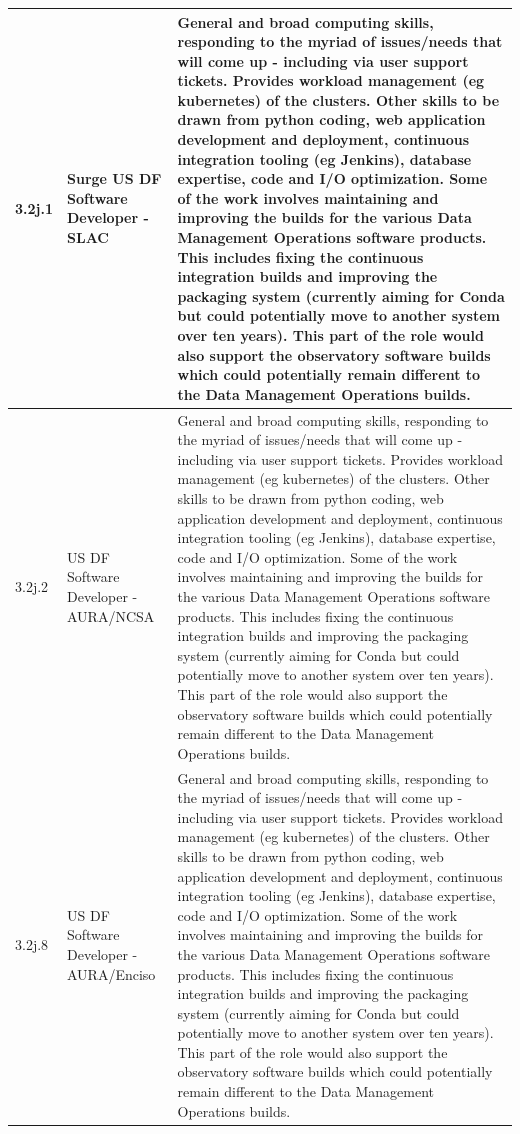\begin{longtable} {|p{}|p{}|p{}|}
{3.2j.1}&{Surge US DF Software Developer - SLAC}&{General and broad computing skills, responding to the myriad of issues/needs that will come up - including via user support tickets. Provides workload management (eg kubernetes) of the clusters. Other skills to be drawn from python coding, web application development and deployment, continuous integration tooling (eg Jenkins), database expertise, code and I/O optimization. Some of the work involves maintaining and improving the builds for the various Data Management Operations software products. This includes fixing the continuous integration builds and improving the packaging system (currently aiming for Conda but could potentially move to another system over ten years). This part of the role would also support the observatory software builds which could potentially remain different to the Data Management Operations builds.} \\ \hline
{3.2j.2}&{US DF Software Developer - AURA/NCSA}&{General and broad computing skills, responding to the myriad of issues/needs that will come up - including via user support tickets. Provides workload management (eg kubernetes) of the clusters. Other skills to be drawn from python coding, web application development and deployment, continuous integration tooling (eg Jenkins), database expertise, code and I/O optimization. Some of the work involves maintaining and improving the builds for the various Data Management Operations software products. This includes fixing the continuous integration builds and improving the packaging system (currently aiming for Conda but could potentially move to another system over ten years). This part of the role would also support the observatory software builds which could potentially remain different to the Data Management Operations builds.} \\ \hline
{3.2j.8}&{US DF Software Developer - AURA/Enciso}&{General and broad computing skills, responding to the myriad of issues/needs that will come up - including via user support tickets. Provides workload management (eg kubernetes) of the clusters. Other skills to be drawn from python coding, web application development and deployment, continuous integration tooling (eg Jenkins), database expertise, code and I/O optimization. Some of the work involves maintaining and improving the builds for the various Data Management Operations software products. This includes fixing the continuous integration builds and improving the packaging system (currently aiming for Conda but could potentially move to another system over ten years). This part of the role would also support the observatory software builds which could potentially remain different to the Data Management Operations builds.} \\ \hline

\end{longtable}
